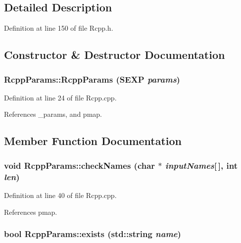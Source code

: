 \subsection{Detailed Description}


Definition at line 150 of file Rcpp.h.

\subsection{Constructor \& Destructor Documentation}
\hypertarget{classRcppParams_7315d083ee0d1d0ca00c3aad0175d524}{
\subsubsection[{RcppParams}]{\setlength{\rightskip}{0pt plus 5cm}RcppParams::RcppParams (SEXP {\em params})}}
\label{classRcppParams_7315d083ee0d1d0ca00c3aad0175d524}




Definition at line 24 of file Rcpp.cpp.

References \_\-params, and pmap.

\subsection{Member Function Documentation}
\hypertarget{classRcppParams_1b8feaf39d3ffdf0f6773c44ac53736c}{
\subsubsection[{checkNames}]{\setlength{\rightskip}{0pt plus 5cm}void RcppParams::checkNames (char $\ast$ {\em inputNames}\mbox{[}$\,$\mbox{]}, \/  int {\em len})}}
\label{classRcppParams_1b8feaf39d3ffdf0f6773c44ac53736c}




Definition at line 40 of file Rcpp.cpp.

References pmap.\hypertarget{classRcppParams_989141ab2a8800b97d91bfb43420c6bc}{
\subsubsection[{exists}]{\setlength{\rightskip}{0pt plus 5cm}bool RcppParams::exists (std::string {\em name})}}
\label{classRcppParams_989141ab2a8800b97d91bfb43420c6bc}




